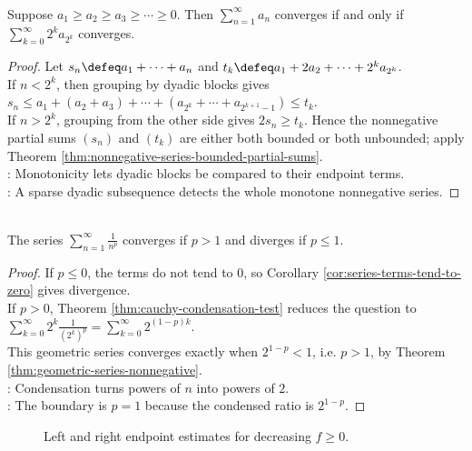 \begin{theorem} \label{thm:cauchy-condensation-test} \\
Suppose $a_1\geq a_2\geq a_3\geq\cdots\geq0$. Then $\sum_{n=1}^{\infty}a_n$ converges if and only if $\sum\limits_{k=0}^{\infty}2^k a_{2^k}$ converges.
\begin{proof}
Let $s_n\defeq a_1+\cdots+a_n$ and $t_k\defeq a_1+2a_2+\cdots+2^k a_{2^k}$.\\
If $n<2^k$, then grouping by dyadic blocks gives $s_n\leq a_1+(a_2+a_3)+\cdots+(a_{2^k}+\cdots+a_{2^{k+1}-1})\leq t_k$.\\
If $n>2^k$, grouping from the other side gives $2s_n\geq t_k$. Hence the nonnegative partial sums $(s_n)$ and $(t_k)$ are either both bounded or both unbounded; apply Theorem \ref{thm:nonnegative-series-bounded-partial-sums}.\\
: Monotonicity lets dyadic blocks be compared to their endpoint terms.\\
: A sparse dyadic subsequence detects the whole monotone nonnegative series.
\end{proof}
\end{theorem}

\begin{corollary} \label{cor:p-series-test} \\
The series $\sum\limits_{n=1}^{\infty}\frac{1}{n^p}$ converges if $p>1$ and diverges if $p\leq1$.
\begin{proof}
If $p\leq0$, the terms do not tend to $0$, so Corollary \ref{cor:series-terms-tend-to-zero} gives divergence.\\
If $p>0$, Theorem \ref{thm:cauchy-condensation-test} reduces the question to $\sum\limits_{k=0}^{\infty}2^k\frac{1}{(2^k)^p}=\sum\limits_{k=0}^{\infty}2^{(1-p)k}$.\\
This geometric series converges exactly when $2^{1-p}<1$, i.e. $p>1$, by Theorem \ref{thm:geometric-series-nonnegative}.\\
: Condensation turns powers of $n$ into powers of $2$.\\
: The boundary is $p=1$ because the condensed ratio is $2^{1-p}$.
\end{proof}
\end{corollary}

\begin{figure}[H]
  \centering
  
  \caption{Left and right endpoint estimates for decreasing $f\geq0$.}
  \label{fig:integral-test-step-functions}
\end{figure}

